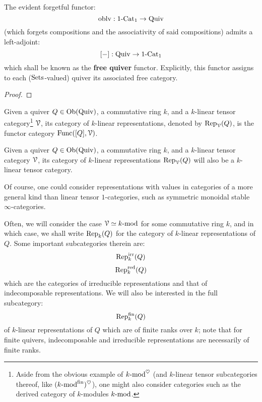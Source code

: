             \begin{proposition} \label{prop: free_quivers}
                The evident forgetful functor:
                    $$\oblv: 1\-\Cat_1 \to \Quiv$$
                (which forgets compositions and the associativity of said compositions) admits a left-adjoint:
                    $$[-]: \Quiv \to 1\-\Cat_1$$
                which shall be known as the \textbf{free quiver} functor. Explicitly, this functor assigns to each ($\Sets$-valued) quiver its associated free category.
            \end{proposition}
                \begin{proof}
                    
                \end{proof}
            \begin{definition} \label{def: quiver_representations}
                Given a quiver $Q \in \Ob(\Quiv)$, a commutative ring $k$, and a $k$-linear tensor category\footnote{Aside from the obvious example of $k\mod^{\heart}$ (and $k$-linear tensor subcategories thereof, like $(k\mod^{\fin})^{\heart}$), one might also consider categories such as the derived category of $k$-modules $k\mod$.} $\calV$, its category of $k$-linear representations, denoted by $\Rep_{\calV}(Q)$, is the functor category $\Func([Q], \calV)$.
            \end{definition}
            \begin{remark}
                Given a quiver $Q \in \Ob(\Quiv)$, a commutative ring $k$, and a $k$-linear tensor category $\calV$, its category of $k$-linear representations $\Rep_{\calV}(Q)$ will also be a $k$-linear tensor category.
                
                Of course, one could consider representations with values in categories of a more general kind than linear tensor $1$-categories, such as symmetric monoidal stable $\infty$-categories. 
            \end{remark}
            \begin{convention}
                Often, we will consider the case $\calV \cong k\mod$ for some commutative ring $k$, and in which case, we shall write $\Rep_k(Q)$ for the category of $k$-linear representations of $Q$. Some important subcategories therein are:
                    $$\Rep_k^{\irr}(Q)$$
                    $$\Rep_k^{\red}(Q)$$
                which are the categories of irreducible representations and that of indecomposable representations. We will also be interested in the full subcategory:
                    $$\Rep_k^{\fin}(Q)$$
                of $k$-linear representations of $Q$ which are of finite ranks over $k$; note that for finite quivers, indecomposable and irreducible representations are necessarily of finite ranks.
            \end{convention}
            
